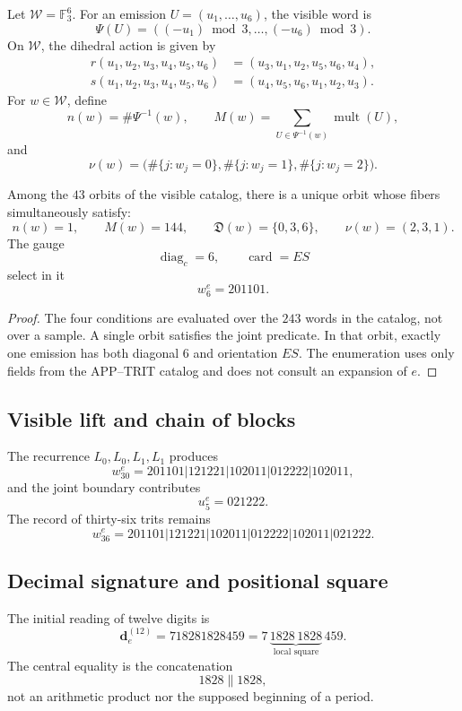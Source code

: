 Let \(\mathcal W=\mathbb F_3^6\). For an emission
\(U=(u_1,\ldots,u_6)\), the visible word is
\[
 \Psi(U)=((-u_1)\bmod3,\ldots,(-u_6)\bmod3).
\]
On \(\mathcal W\), the dihedral action is given by
\[
\begin{aligned}
 r(u_1,u_2,u_3,u_4,u_5,u_6)
 &=(u_3,u_1,u_2,u_5,u_6,u_4),\\
 s(u_1,u_2,u_3,u_4,u_5,u_6)
 &=(u_4,u_5,u_6,u_1,u_2,u_3).
\end{aligned}
\]
For \(w\in\mathcal W\), define
\[
 n(w)=\#\Psi^{-1}(w),
 \qquad
 M(w)=\sum_{U\in\Psi^{-1}(w)}\operatorname{mult}(U),
\]
and
\[
 \nu(w)=
 \bigl(
 \#\{j:w_j=0\},
 \#\{j:w_j=1\},
 \#\{j:w_j=2\}
 \bigr).
\]

\begin{theorem}
\label{p12-83-c9-s2:thm:seleccion-estructural-e}
Among the \(43\) orbits of the visible catalog, there is a unique orbit whose
fibers simultaneously satisfy:
\[
 n(w)=1,\qquad M(w)=144,\qquad
 \mathfrak D(w)=\{0,3,6\},\qquad
 \nu(w)=(2,3,1).
\]
The gauge
\[
 \operatorname{diag}_c=6,
 \qquad \operatorname{card}=ES
\]
select in it
\[
 \boxed{w_6^e=201101.}
\]
\end{theorem}

\begin{proof}
The four conditions are evaluated over the \(243\) words in the catalog, not over a sample. A single orbit satisfies the joint predicate. In that orbit, exactly one emission has both diagonal \(6\) and orientation \(ES\). The enumeration uses only fields from the APP--TRIT catalog and does not consult an expansion of \(e\).
\end{proof}

\subsection{Visible lift and chain of blocks}

The recurrence \(L_0,L_0,L_1,L_1\) produces
\[
 w_{30}^{e}
 =201101|121221|102011|012222|102011,
\]
and the joint boundary contributes
\[
 u_5^e=021222.
\]
The record of thirty-six trits remains
\[
 w_{36}^{e}
 =201101|121221|102011|012222|102011|021222.
\]

\subsection{Decimal signature and positional square}

The initial reading of twelve digits is
\[
 \mathbf d_e^{(12)}
 =718281828459
 =7\,\underbrace{1828\,1828}_{\text{local square}}\,459.
\]
The central equality is the concatenation
\[
 1828\mathbin{\|}1828,
\]
not an arithmetic product nor the supposed beginning of a period.

